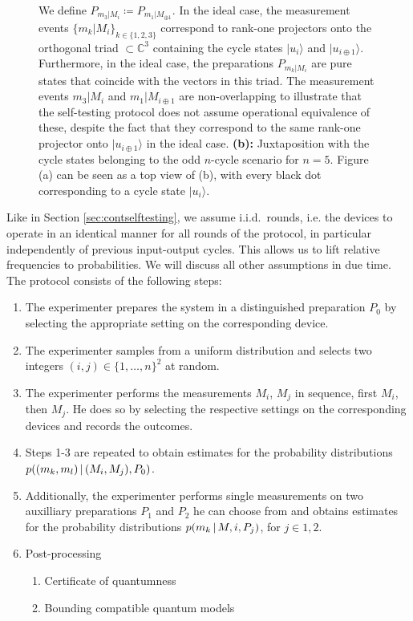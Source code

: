 \begin{figure}
{We define $P_{m_3\vert M_i}\coloneqq P_{m_1\vert M_{\oplus 1}}$. In the ideal case, the measurement events $\{m_k\vert M_i\}_{k\in\{1,2,3\}}$ correspond to rank-one projectors onto the orthogonal triad $\subset \mathbb{C}^3$ containing the cycle states $\vert u_i\rangle$ and $\vert u_{i\oplus 1}\rangle$. Furthermore, in the ideal case, the preparations $P_{m_k\vert M_i}$ are pure states that coincide with the vectors in this triad. The measurement events $m_3\vert M_i$ and $m_1\vert M_{i\oplus 1}$ are non-overlapping to illustrate that the self-testing protocol does not assume operational equivalence of these, despite the fact that they correspond to the same rank-one projector onto $\vert u_{i\oplus 1}\rangle$ in the ideal case. \textbf{(b):} Juxtaposition with the cycle states belonging to the odd $n$-cycle scenario for $n=5$. Figure (a) can be seen as a top view of (b), with every black dot corresponding to a cycle state $\vert u_i\rangle$.}
\label{fig:ncycleselftesting}
\end{figure}

Like in Section \ref{sec:contselftesting}, we assume i.i.d.\ rounds, i.e. the devices to operate in an identical manner for all rounds of the protocol, in particular independently of previous input-output cycles. This allows us to lift relative frequencies to probabilities. We will discuss all other assumptions in due time. The protocol consists of the following steps:
\begin{enumerate}
\item The experimenter prepares the system in a distinguished preparation $P_0$ by selecting the appropriate setting on the corresponding device.
\item The experimenter samples from a uniform distribution and selects two integers $(i,j)\in\{1,\dots,n\}^2$ at random.
\item The experimenter performs the measurements $M_i$, $M_j$ in sequence, first $M_i$, then $M_j$. He does so by selecting the respective settings on the corresponding devices and records the outcomes.
\item Steps 1-3 are repeated to obtain estimates for the probability distributions \\ $p((m_k,m_l)\thinspace\vert\thinspace (M_i,M_j),P_0)$. 
\item Additionally, the experimenter performs single measurements on two auxilliary preparations $P_1$ and $P_2$ he can choose from and obtains estimates for the probability distributions $p(m_k\thinspace\vert\thinspace M,i, P_j)$, for $j\in{1,2}$.
\item Post-processing
	\begin{enumerate}
	\item Certificate of quantumness
	\item Bounding compatible quantum models
	\end{enumerate}
\end{enumerate}

